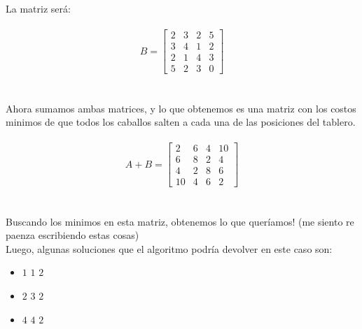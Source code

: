 La matriz será:
\\
\\
$$B = \begin{bmatrix}
      2 & 3 & 2 & 5  \\[0.3em]
      3 & 4 & 1 & 2  \\[0.3em]
      2 & 1 & 4 & 3  \\[0.3em]
      5 & 2 & 3 & 0
\end{bmatrix}$$
\\
\\
Ahora sumamos ambas matrices, y lo que obtenemos es una matriz con los costos minimos de que todos los caballos salten a cada una de las posiciones del tablero.
\\
\\
$$A + B =  \begin{bmatrix}
          2 & 6 & 4 & 10 \\[0.3em]
          6 & 8 & 2 & 4 \\[0.3em]
          4 & 2 & 8 & 6 \\[0.3em]
          10 & 4 & 6 & 2 
          \end{bmatrix}
          $$
\\
\\
Buscando los minimos en esta matriz, obtenemos lo que quer\'iamos! (me siento re paenza escribiendo estas cosas)
\\
Luego, algunas soluciones que el algoritmo podr\'ia devolver en este caso son:
\\
\begin{itemize}
\item $1$ $1$ $2$ 
\item $2$ $3$ $2$
\item $4$ $4$ $2$ 
\end{itemize}

